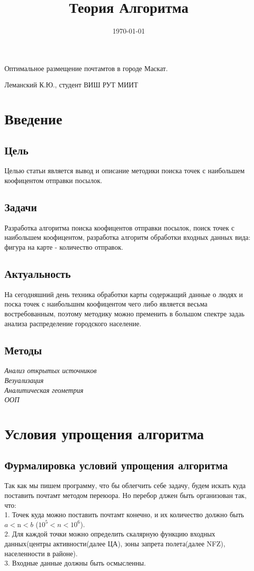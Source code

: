 \documentclass[12pt]{article} %
\title{Теория Алгоритма} %
\date{\today} %
\begin{document}
 	
 	\begin{center}
 		\Huge{Оптимальное размещение почтамтов в городе Маскат.}
 		\end{center} 
 	\begin{flushright}
 		Леманский К.Ю., студент ВИШ РУТ МИИТ
 	\end{flushright}
 		
 	\newpage
 	\tableofcontents
 	\newpage
 	\section{Введение}
 	\subsection{Цель}
 	Целью статьи является вывод и описание методики поиска точек с наибольшем коофицентом отправки посылок.\\
 	\subsection{Задачи}
 	Разработка алгоритма поиска коофицентов отправки посылок, поиск точек с наибольшем коофицентом, разработка алгоритм обработки входных данных вида: фигура на карте - количество отправок.
 	\subsection{Актуальность}
 	На сегодняшний день техника обработки карты содержащий данные о людях и поска точек с наибольшнм коофицентом чего либо является весьма востребованным, поэтому методику можно пременить в большом спектре задаь анализа распределение городского население.
 	\subsection{Методы}
 	\textit{Анализ открытых источников \\ Везуализация \\ Аналитическая геометрия\\ ООП}
 	\section{Условия упрощения алгоритма}
 	\subsection{Фурмалировка условий упрощения алгоритма}
 	\hspace*{1cm}Так как мы пишем программу, что бы облегчить себе задачу, будем искать куда поставить почтамт методом переюора. Но перебор длжен быть организован так, что:\\
 	\hspace*{5mm}1. Точек куда можно поставить почтамт конечно, и их количество должно быть \(a<\text{n}<b\) ($10^5<n<10^6$).\\
 	\hspace*{5mm}2. Для каждой точки можно определить скалярную функцию входных данных(центры активности(далее ЦА), зоны запрета полета(далее NFZ), населенности в районе).\\
 	\hspace*{5mm}3. Входные данные должны быть осмысленны.
\end{document}
